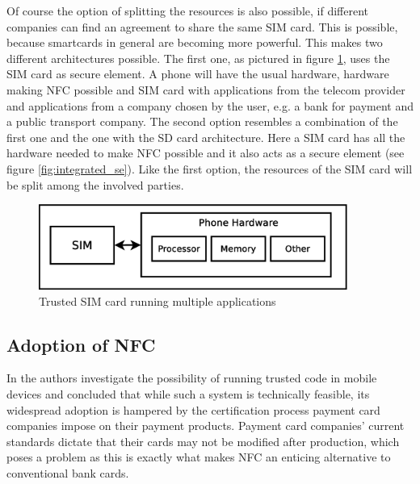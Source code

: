 Of course the option of splitting the resources is also possible, if different companies can find an agreement to share the same SIM card.
This is possible, because smartcards in general are becoming more powerful.
This makes two different architectures possible.
The first one, as pictured in figure \ref{fig:sim_se}, uses the SIM card as secure element.
A phone will have the usual hardware, hardware making NFC possible and SIM card with applications from the telecom provider and applications from a company chosen by the user, e.g. a bank for payment and a public transport company. 
The second option resembles a combination of the first one and the one with the SD card architecture.
Here a SIM card has all the hardware needed to make NFC possible and it also acts as a secure element (see figure \ref{fig:integrated_se}).
Like the first option, the resources of the SIM card will be split among the involved parties.
\begin{figure}
\includegraphics[width=0.9\textwidth]{images/SIM_is_SE}
\caption[Trusted SIM cards]
{
Trusted SIM card running multiple applications
}
\label{fig:sim_se}
\end{figure}



\subsection{Adoption of NFC}
In \cite{1497411} the authors investigate the possibility of running trusted code in mobile devices and concluded that while such a system is technically feasible, its widespread adoption is hampered by the certification process payment card companies impose on their payment products.
Payment card companies' current standards dictate that their cards may not be modified after production, which poses a problem as this is exactly what makes NFC an enticing alternative to conventional bank cards.

